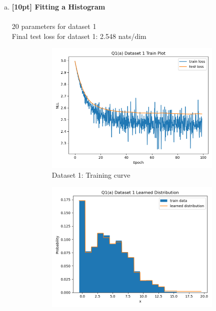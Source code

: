 \documentclass{article}
\begin{document}
\begin{enumerate}[(a)]

\item {\bf [10pt] Fitting a Histogram} \\\\
20 parameters for dataset 1 \\
Final test loss for dataset 1: 2.548 nats/dim
\begin{figure}[H]
    \centering
    \begin{subfigure}{0.4\textwidth}
        \centering
        \includegraphics[width=\textwidth]{figures/q1_a_dset1_train_plot.png}
        \caption{Dataset 1: Training curve}
    \end{subfigure}
    \hspace{0.2in}
    \begin{subfigure}{0.4\textwidth}
        \centering
        \includegraphics[width=\textwidth]{figures/q1_a_dset1_learned_dist.png}

\end{subfigure}
\end{figure}
\end{enumerate}
\end{document}
